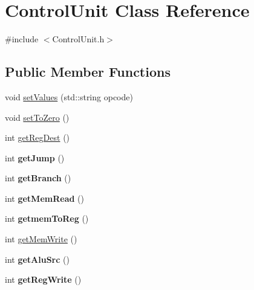 \hypertarget{class_control_unit}{}\section{Control\+Unit Class Reference}
\label{class_control_unit}


{\ttfamily \#include $<$Control\+Unit.\+h$>$}

\subsection*{Public Member Functions}
\begin{DoxyCompactItemize}
\item 
void \mbox{\hyperlink{class_control_unit_ac8da21614dd49149be858ad36ceb1cb6}{set\+Values}} (std\+::string opcode)
\item 
void \mbox{\hyperlink{class_control_unit_acc570fb783844eb7c25fc0df6163270c}{set\+To\+Zero}} ()
\item 
int \mbox{\hyperlink{class_control_unit_aeddfdfe24c6ec8c46394949c1a50adc7}{get\+Reg\+Dest}} ()
\item 
\mbox{\label{class_control_unit_a6d8d4d2874c72607e34ed8781ff2d64a}} 
int {\bfseries get\+Jump} ()
\item 
\mbox{\label{class_control_unit_a6b3585a68a1f3a8fc7e700063cf4f449}} 
int {\bfseries get\+Branch} ()
\item 
\mbox{\label{class_control_unit_a11ba2693b002766ca5652e972d69f01a}} 
int {\bfseries get\+Mem\+Read} ()
\item 
\mbox{\label{class_control_unit_a49650b7b8f354da8f04f8f9533931322}} 
int {\bfseries getmem\+To\+Reg} ()
\item 
int \mbox{\hyperlink{class_control_unit_a7fc9545b8dd4a871e1f64b78cf914773}{get\+Mem\+Write}} ()
\item 
\mbox{\label{class_control_unit_aa08e98486f69fc1ebc87509fb8eebb9f}} 
int {\bfseries get\+Alu\+Src} ()
\item 
\mbox{\label{class_control_unit_a36411dc5a7ac1e55db4d8dfa47f91e6b}} 
int {\bfseries get\+Reg\+Write} ()
\item 

\end{DoxyCompactItemize}
